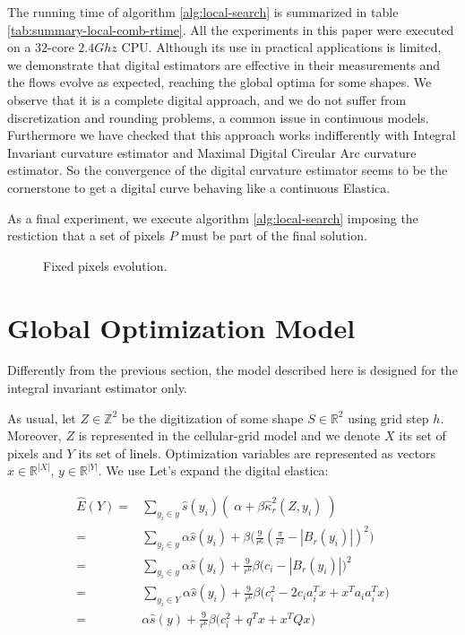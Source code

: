 




The running time of algorithm \ref{alg:local-search} is summarized in table \ref{tab:summary-local-comb-rtime}. All the experiments in this paper were executed on a $32$-core $2.4Ghz$ CPU. Although its use in practical applications is
limited, we demonstrate that digital estimators are effective in their measurements and the flows evolve as expected, reaching the global optima for some shapes. We
observe that it is a complete digital approach, and we do not suffer from discretization and rounding problems, a common
issue in continuous models.  Furthermore we have checked that this approach works indifferently with Integral Invariant
curvature estimator and Maximal Digital Circular Arc curvature estimator. So the convergence of the digital curvature
estimator seems to be the cornerstone to get a digital curve behaving like a continuous Elastica.  

As a final experiment, we execute algorithm \ref{alg:local-search} imposing the restiction that a set of pixels $P$ must be part of the final solution.

\begin{figure}[h!]

\caption{Fixed pixels evolution.}
\end{figure}




\section{Global Optimization Model}

Differently from the previous section, the model described here is designed for the integral invariant estimator only.

As usual, let $Z \in \mathbb{Z}^2$ be the digitization of some shape $S \in \mathbb{R}^2$ using grid step $h$. Moreover, $Z$ is represented in the cellular-grid model and we denote $X$ its set of pixels and $Y$ its set of linels. Optimization variables are represented as vectors $x \in \mathbb{R}^{|X|},\, y \in \mathbb{R}^{|Y|}$.  We use  Let's expand the digital elastica:


\begin{align}
	\hat{E}(Y) =& \sum_{y_i \in y}{ \hat{s}(y_i)\left(\; \alpha + \beta \hat{\kappa}_{r}^2(Z,y_i) \; \right)}\\\nonumber
			   =& \sum_{y_i \in y} \alpha \hat{s}(y_i) + \beta \big( \frac{9}{r^6}(\frac{\pi}{r^2} - |B_r(y_i)|)^2\big)\\\nonumber
			   =& \sum_{y_i \in y} \alpha \hat{s}(y_i) + \frac{9}{r^6}\beta \big(c_i - |B_r(y_i)|\big)^2\\\nonumber
			   =& \sum_{y_i \in Y} \alpha \hat{s}(y_i) + \frac{9}{r^6}\beta \big(c_i^2 - 2c_ia_i^Tx + x^Ta_ia_i^Tx\big)\\\nonumber			   
			   =& \alpha \hat{s}(y) + \frac{9}{r^6}\beta \big(c_i^2 + q^Tx + x^TQx\big)
	\end{align}
	
